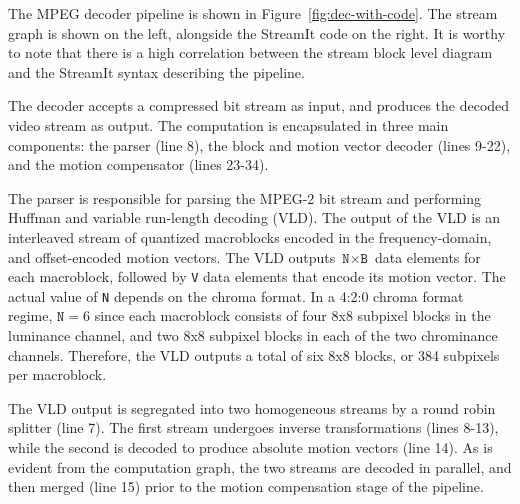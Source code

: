 \begin{figure*}[t]
  \centerline{}
  \caption{MPEG-2 decoder block diagram and corresponding StreamIt code.}
  \label{fig:dec-with-code}
\end{figure*}


The MPEG decoder pipeline is shown in
Figure~\ref{fig:dec-with-code}. The stream graph is shown on the left,
alongside the StreamIt code on the right. It is worthy to note that
there is a high correlation between the stream block level diagram and
the StreamIt syntax describing the pipeline.

The decoder accepts a compressed bit stream as input, and produces the
decoded video stream as output. The computation is encapsulated in
three main components: the parser (line 8), the block and motion vector
decoder (lines 9-22), and the motion compensator (lines 23-34).

The parser is responsible for parsing the MPEG-2 bit stream and
performing Huffman and variable run-length decoding (VLD). The output
of the VLD is an interleaved stream of quantized macroblocks encoded
in the frequency-domain, and offset-encoded motion vectors. The VLD
outputs $\texttt{N}\times\texttt{B}$ data elements for each
macroblock, followed by \texttt{V} data elements that encode its
motion vector. The actual value of \texttt{N} depends on the chroma
format. In a 4:2:0 chroma format regime, $\texttt{N}=6$ since each
macroblock consists of four 8x8 subpixel blocks in the luminance channel,
and two 8x8 subpixel blocks in each of the two chrominance
channels. Therefore, the VLD outputs a total of six 8x8 blocks,
or 384 subpixels per macroblock.

The VLD output is segregated into two homogeneous streams by a
round robin splitter (line 7). The first stream undergoes inverse
transformations (lines 8-13), while the second is decoded to produce
absolute motion vectors (line 14). As is evident from the computation
graph, the two streams are decoded in parallel, and then merged (line
15) prior to the motion compensation stage of the pipeline.

